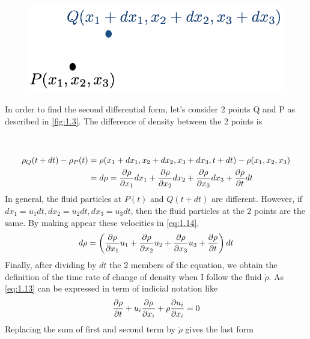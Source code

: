 	\begin{figure}
	\vspace{-5mm}
	\includegraphics[scale=0.35]{ch1/3}
	\label{fig:1.3}
	\end{figure}
	In order to find the second differential form, let's consider 2 points Q and P as described in \autoref{fig:1.3}. The difference of density between the 2 points is \\\\\\
	\begin{equation}
	\begin{aligned}
		\rho _Q(t+dt) - \rho _P(t) &= \rho (x_1+dx_1,x_2+dx_2,x_3+dx_3,t+dt) - \rho (x_1,x_2,x_3)  \\
		&= d\rho = \frac{\D \rho}{\D x_1}dx_1 + \frac{\D \rho}{\D x_2}dx_2 + \frac{\D \rho}{\D x_3}dx_3 + \frac{\D \rho}{\D t}dt
		\end{aligned}
		\label{eq:1.14}
	\end{equation}
	In general, the fluid particles at $P(t)$ and $Q(t+dt)$ are different. However, if $dx_1 = u_1 dt, dx_2 = u_2 dt, dx_3 = u_3 dt$, then the fluid particles at the 2 points are the same. By making appear these velocities in \eqref{eq:1.14}, 
	\begin{equation}
		d\rho = \left( \frac{\D \rho}{\D x_1}u_1 + \frac{\D \rho}{\D x_2}u_2 + \frac{\D \rho}{\D x_3}u_3 + \frac{\D \rho}{\D t}\right) dt
	\end{equation}
	Finally, after dividing by $dt$ the 2 members of the equation, we obtain the definition of the time rate of change of density when I follow the fluid $\dot{\rho}$. As \eqref{eq:1.13} can be expressed in term of indicial notation like 
	\begin{equation}
		\frac{\D \rho}{\D t} + u_i \frac{\D\rho}{\D x_i} + \rho \frac{\D u_i}{\D x_i} = 0 
	\end{equation}
	Replacing the sum of first and second term by $\dot{\rho}$ gives the last form
	\begin{center}
	\end{center}
	
